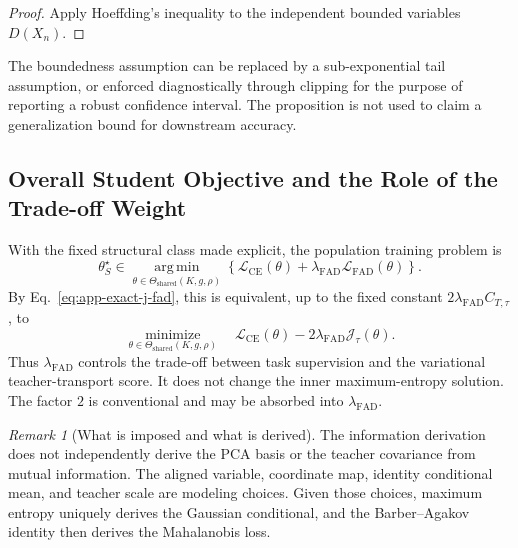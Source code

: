 \documentclass{article}
\newcommand{\calL}{\mathcal{L}}
\newcommand{\FAD}{\mathrm{FAD}}
\newcommand{\CE}{\mathrm{CE}}
\theoremstyle{plain}
\theoremstyle{definition}
\theoremstyle{remark}
\newtheorem{remark}{Remark}
\begin{document}
\begin{proof}
Apply Hoeffding's inequality to the independent bounded variables $D(X_n)$.
\end{proof}

The boundedness assumption can be replaced by a sub-exponential tail assumption,
or enforced diagnostically through clipping for the purpose of reporting a robust
confidence interval.  The proposition is not used to claim a generalization bound
for downstream accuracy.

\subsection{Overall Student Objective and the Role of the Trade-off Weight}
\label{app:overall-objective}

With the fixed structural class made explicit, the population training problem is
\begin{equation}
  \theta_S^\star
  \in\underset{\theta\in\Theta_{\mathrm{shared}}(K,g,\rho)}
  {\operatorname{arg\,min}}
  \left\{\calL_{\CE}(\theta)+
  \lambda_{\FAD}\calL_{\FAD}(\theta)\right\}.
  \label{eq:app-complete-training-objective}
\end{equation}
By Eq.~\eqref{eq:app-exact-j-fad}, this is equivalent, up to the fixed constant
$2\lambda_{\FAD}C_{T,\tau}$, to
\begin{equation}
  \underset{\theta\in\Theta_{\mathrm{shared}}(K,g,\rho)}
  {\operatorname{minimize}}
  \quad \calL_{\CE}(\theta)-2\lambda_{\FAD}\mathcal J_{\tau}(\theta).
  \label{eq:app-ce-minus-information}
\end{equation}
Thus $\lambda_{\FAD}$ controls the trade-off between task supervision and the
variational teacher-transport score.  It does not change the inner
maximum-entropy solution.  The factor $2$ is conventional and may be absorbed
into $\lambda_{\FAD}$.

\begin{remark}[What is imposed and what is derived]
\label{rem:app-imposed-derived}
The information derivation does not independently derive the PCA basis or the
teacher covariance from mutual information.  The aligned variable, coordinate
map, identity conditional mean, and teacher scale are modeling choices.  Given
those choices, maximum entropy uniquely derives the Gaussian conditional, and the
Barber--Agakov identity then derives the Mahalanobis loss.
\end{remark}
\end{document}
